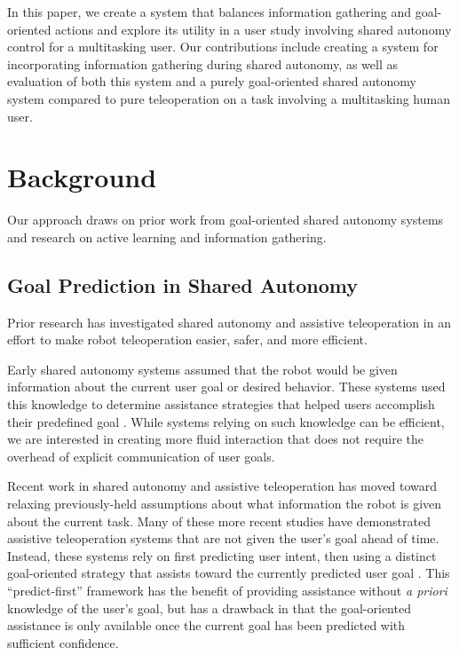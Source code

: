 \documentclass[conference]{IEEEtran}
\begin{document}
In this paper, we create a system that balances information gathering and goal-oriented actions and explore its utility in a user study involving shared autonomy control for a multitasking user. Our contributions include creating a system for incorporating information gathering during shared autonomy, as well as evaluation of both this system and a purely goal-oriented shared autonomy system compared to pure teleoperation on a task involving a multitasking human user.

\section{Background}

Our approach draws on prior work from goal-oriented shared autonomy systems and research on active learning and information gathering.

\subsection{Goal Prediction in Shared Autonomy}

Prior research has investigated shared autonomy and assistive teleoperation in an effort to make robot teleoperation easier, safer, and more efficient.

Early shared autonomy systems assumed that the robot would be given information about the current user goal or desired behavior. These systems used this knowledge to determine assistance strategies that helped users accomplish their predefined goal \cite{aigner1997human, debus2001cooperative, goodrich2001experiments}. While systems relying on such knowledge can be efficient, we are interested in creating more fluid interaction that does not require the overhead of explicit communication of user goals.

Recent work in shared autonomy and assistive teleoperation has moved toward relaxing previously-held assumptions about what information the robot is given about the current task. Many of these more recent studies have demonstrated assistive teleoperation systems that are not given the user's goal ahead of time. Instead, these systems rely on first predicting user intent, then using a distinct goal-oriented strategy that assists toward the currently predicted user goal \cite{dragan2012formalizing, fagg2004extracting, kragic2005human, schultz2017goal, yu2005telemanipulation}. This ``predict-first'' framework has the benefit of providing assistance without \textit{a priori} knowledge of the user's goal, but has a drawback in that the goal-oriented assistance is only available once the current goal has been predicted with sufficient confidence.
\end{document}
